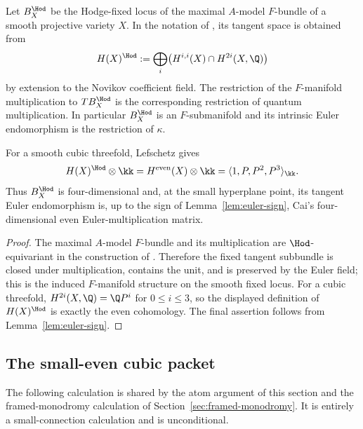 \begin{lemma}\label{lem:hodge-base}
%
%
%
%
Let $B_X^{\Hod}$ be the Hodge-fixed locus of the maximal $A$-model
$F$-bundle of a smooth projective variety $X$.  In the notation of
\cite[Section~5.2.2]{KKPYY}, its tangent space is obtained from
\[
 H(X)^{\Hod}:=
 \bigoplus_i\bigl(H^{i,i}(X)\cap H^{2i}(X,\Q)\bigr)
\]
by extension to the Novikov coefficient field.  The restriction of the
$F$-manifold multiplication to $T B_X^{\Hod}$ is the corresponding
restriction of quantum multiplication.  In particular $B_X^{\Hod}$ is an
$F$-submanifold and its intrinsic Euler endomorphism is the restriction of
$\kappa$.

For a smooth cubic threefold, Lefschetz gives
\[
 H(X)^{\Hod}\otimes\kk
 =H^{\mathrm{even}}(X)\otimes\kk
 =\langle 1,P,P^2,P^3\rangle_{\kk}.
\]
Thus $B_X^{\Hod}$ is four-dimensional and, at the small hyperplane point,
its tangent Euler endomorphism is, up to the sign of
Lemma~\ref{lem:euler-sign}, Cai's four-dimensional even Euler-multiplication
matrix.
\end{lemma}

\begin{proof}
The maximal $A$-model $F$-bundle and its multiplication are
$\Hod$-equivariant in the construction of \cite{KKPYY}.  Therefore the
fixed tangent subbundle is closed under multiplication, contains the unit,
and is preserved by the Euler field; this is the induced $F$-manifold
structure on the smooth fixed locus.  For a cubic threefold,
$H^{2i}(X,\Q)=\Q P^i$ for $0\le i\le3$, so the displayed definition of
$H(X)^{\Hod}$ is exactly the even cohomology.  The final assertion follows
from Lemma~\ref{lem:euler-sign}.
%
\end{proof}


\subsection{The small-even cubic packet}\label{subsec:shared-cubic-packet}

The following calculation is shared by the atom argument of this section and
the framed-monodromy calculation of Section~\ref{sec:framed-monodromy}.  It
is entirely a small-connection calculation and is unconditional.

